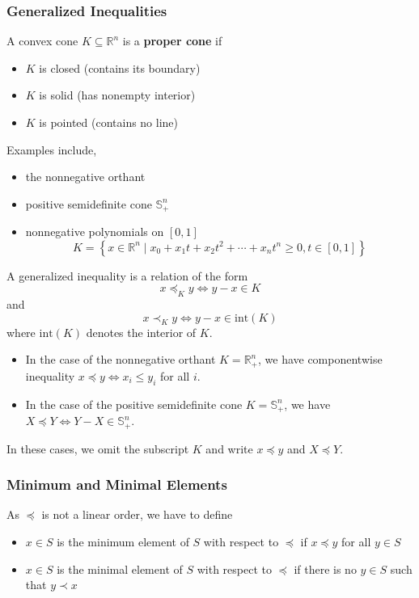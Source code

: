 \documentclass[11pt]{article}
\begin{document}
\subsubsection*{Generalized Inequalities} 
A convex cone $K \subseteq \mathbb{R}^n$ is a \textbf{proper cone} if 
\begin{itemize}
    \item $K$ is closed (contains its boundary)
    \item $K$ is solid (has nonempty interior)
    \item $K$ is pointed (contains no line)
\end{itemize}
Examples include, 
\begin{itemize}
    \item the nonnegative orthant
    \item positive semidefinite cone $\mathbb{S}_+^n$
    \item nonnegative polynomials on $[0, 1]$ 
    \[ K = \left\{ x \in \mathbb{R}^n \mid x_0 + x_1t + x_2t^2 + \cdots + x_nt^n \geq 0, t \in [0, 1] \right\} \] 
\end{itemize}

A generalized inequality is a relation of the form 
\[ x \preceq_K y \Leftrightarrow y - x \in K \] 
and 
\[ x \prec_K y \Leftrightarrow y - x \in \mathrm{int}(K) \] 
where $\mathrm{int}(K)$ denotes the interior of $K$. \par 
\begin{itemize}
    \item In the case of the nonnegative orthant $K = \mathbb{R}^n_+$, we have componentwise inequality $x \preceq y \Leftrightarrow x_i \leq y_i$ for all $i$. 
    \item In the case of the positive semidefinite cone $K = \mathbb{S}_+^n$, we have $X \preceq Y \Leftrightarrow Y - X \in \mathbb{S}_+^n$.
\end{itemize}
In these cases, we omit the subscript $K$ and write $x \preceq y$ and $X \preceq Y$. \par

\subsubsection*{Minimum and Minimal Elements} 
As $\preceq$ is not a linear order, we have to define 
\begin{itemize}
    \item $x \in S$ is the minimum element of $S$ with respect to $\preceq$ if $x \preceq y$ for all $y \in S$
    \item $x \in S$ is the minimal element of $S$ with respect to $\preceq$ if there is no $y \in S$ such that $y \prec x$
\end{itemize}
\end{document}

